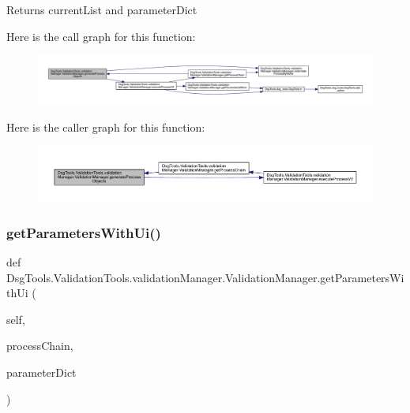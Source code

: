 \begin{DoxyVerb}Returns currentList and parameterDict
\end{DoxyVerb}
 Here is the call graph for this function\+:
\nopagebreak
\begin{figure}[H]
\begin{center}
\leavevmode
\includegraphics[width=350pt]{class_dsg_tools_1_1_validation_tools_1_1validation_manager_1_1_validation_manager_add0d3a87de62da336d733cf3b1aae3b4_cgraph}
\end{center}
\end{figure}
Here is the caller graph for this function\+:
\nopagebreak
\begin{figure}[H]
\begin{center}
\leavevmode
\includegraphics[width=350pt]{class_dsg_tools_1_1_validation_tools_1_1validation_manager_1_1_validation_manager_add0d3a87de62da336d733cf3b1aae3b4_icgraph}
\end{center}
\end{figure}
\mbox{\label{class_dsg_tools_1_1_validation_tools_1_1validation_manager_1_1_validation_manager_aaba55832ad4846f8009124924c5b3cca}} 
\subsubsection{\texorpdfstring{get\+Parameters\+With\+Ui()}{getParametersWithUi()}}
{\footnotesize\ttfamily def Dsg\+Tools.\+Validation\+Tools.\+validation\+Manager.\+Validation\+Manager.\+get\+Parameters\+With\+Ui (\begin{DoxyParamCaption}\item[{}]{self,  }\item[{}]{process\+Chain,  }\item[{}]{parameter\+Dict }\end{DoxyParamCaption})}

